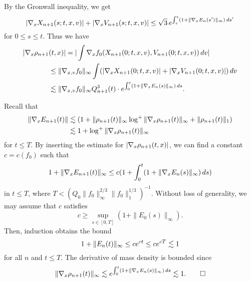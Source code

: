 \documentclass[11pt]{amsart}
\begin{document}
\begin{pfs}
By the Gronwall inequality, we get
\[|\nabla_xX_{n+1}(s;t,x,v)|+|\nabla_xV_{n+1}(s;t,x,v)|\le\sqrt3\,e^{\int_s^t(1+\|\nabla_xE_n(s')\|_\infty)\,ds'}\]
for $0\le s\le t$.
Thus we have
\begin{align*}
|\nabla_x\rho_{n+1}&(t,x)|
=|\int\nabla_xf_0(X_{n+1}(0;t,x,v),V_{n+1}(0;t,x,v))\,dv|\\
&\le\|\nabla_{x,v}f_0\|_\infty\int(|\nabla_xX_{n+1}(0;t,x,v)|+|\nabla_xV_{n+1}(0;t,x,v)|)\,dv\\
&\lesssim\|\nabla_{x,v}f_0\|_\infty Q_{n+1}^3(t)\cdot e^{\int_0^t(1+\|\nabla_xE_n(s)\|_\infty)\,ds}.
\end{align*}

Recall that
\begin{align*}
\|\nabla_xE_{n+1}(t)\|
&\lesssim(1+\|\rho_{n+1}(t)\|_\infty\log^+\|\nabla_x\rho_{n+1}(t)\|_\infty+\|\rho_{n+1}(t)\|_1)\\
&\lesssim1+\log^+\|\nabla_x\rho_{n+1}(t)\|_\infty
\end{align*}
for $t\le T$.
By inserting the estimate for $|\nabla_x\rho_{n+1}(t,x)|$, we can find a constant $c=c(f_0)$ such that
\begin{align*}
1+\|\nabla_xE_{n+1}(t)\|_\infty\le c(1+\int_0^t(1+\|\nabla_xE_n(s)\|_\infty)\,ds)
\end{align*}
in $t\le T$, where $T<(Q_0\|f_0\|_\infty^{2/3}\|f_0\|_1^{1/3})^{-1}$.
Without loss of generality, we may assume that $c$ satisfies
\[c\ge\sup_{s\in[0,T]}(1+\|E_0(s)\|_\infty).\]
Then, induction obtains the bound
\[1+\|E_n(t)\|_\infty\le ce^{ct}\le ce^{cT}\lesssim1\]
for all $n$ and $t\le T$.
The derivative of mass density is bounded since
\[\|\nabla_x\rho_{n+1}(t)\|_\infty\lesssim e^{\int_0^t(1+\|\nabla_xE_n(s)\|_\infty)\,ds}\lesssim1.\qedhere\]
\end{pfs}
\end{document}
